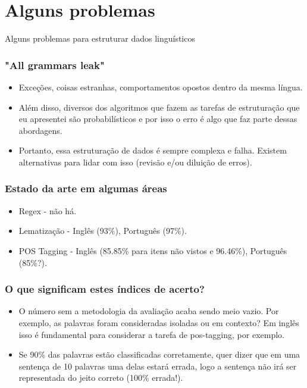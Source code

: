\documentclass[11pt]{beamer}
\begin{document}
\section{Alguns problemas}
\begin{frame}
\begin{center}
	Alguns problemas para estruturar dados linguísticos
\end{center}
\end{frame}
\begin{frame}
\frametitle{"All grammars leak"}
\begin{itemize}
	\item <1-> Exceções, coisas estranhas, comportamentos opostos dentro da mesma língua.\\
	\item <2-> Além disso, diversos dos algoritmos que fazem as tarefas de estruturação que eu apresentei são probabilísticos e por isso o erro é algo que faz parte dessas abordagens.\\
	\item <3-> Portanto, essa estruturação de dados é sempre complexa e falha. Existem alternativas para lidar com isso (revisão e/ou diluição de erros).\\
\end{itemize}
\end{frame}
\begin{frame}
\frametitle{Estado da arte em algumas áreas}
\begin{itemize}
	\item Regex - não há.\\
	\item Lematização - Inglês (93\%), Português (97\%).\\
	\item POS Tagging - Inglês (85.85\% para itens não vistos e 96.46\%), Português (85\%?).\\
\end{itemize}
\end{frame}
\begin{frame}
\frametitle{O que significam estes índices de acerto?}
\begin{itemize}
	\item O número sem a metodologia da avaliação acaba sendo meio vazio. Por exemplo, as palavras foram consideradas isoladas ou em contexto? Em inglês isso é fundamental para considerar a tarefa de pos-tagging, por exemplo.\\
	\item Se 90\% das palavras estão classificadas corretamente, quer dizer que em uma sentença de 10 palavras uma delas estará errada, logo a sentença não irá ser representada do jeito correto (100\% errada!).\\
\end{itemize}
\end{frame}
\end{document}
